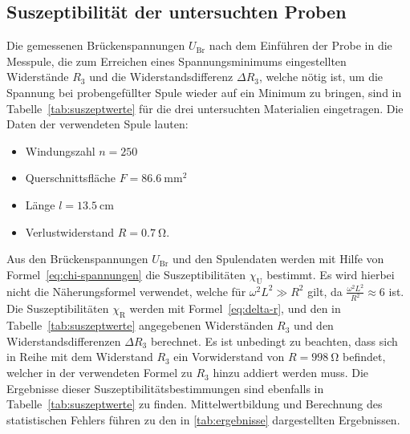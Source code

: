 \subsection{Suszeptibilität der untersuchten Proben}
%
Die gemessenen Brückenspannungen $U_\text{Br}$ nach dem Einführen der
Probe in die Messpule, die zum Erreichen eines Spannungsminimums
eingestellten Widerstände $R_3$ und die Widerstandsdifferenz $\Delta
R_3$, welche nötig ist, um die Spannung bei probengefüllter Spule wieder
auf ein Minimum zu bringen, sind in Tabelle~\ref{tab:suszeptwerte} für
die drei untersuchten Materialien eingetragen.  Die Daten der
verwendeten Spule lauten:
%
\begin{itemize}
\item Windungszahl $n = 250$
\item Querschnittsfläche $F = \SI{86.6}{\milli\metre^2}$
\item Länge $l = \SI{13.5}{\centi\metre}$
\item Verlustwiderstand $R = \SI{0.7}{\ohm}$.
\end{itemize}

Aus den Brückenspannungen $U_\text{Br}$ und den Spulendaten werden mit
Hilfe von Formel~\eqref{eq:chi-spannungen} die Suszeptibilitäten
$\chi_\text{U}$ bestimmt.  Es wird hierbei nicht die Näherungsformel
verwendet, welche für $\omega^2 L^2 \gg R^2$ gilt, da $\frac{\omega^2
  L^2}{R^2} \approx 6$ ist.  Die Suszeptibilitäten $\chi_\text{R}$
werden mit Formel~\eqref{eq:delta-r}, und den in
Tabelle~\ref{tab:suszeptwerte} angegebenen Widerständen $R_3$ und den
Widerstandsdifferenzen $\Delta R_3$ berechnet.  Es ist unbedingt zu
beachten, dass sich in Reihe mit dem Widerstand $R_3$ ein Vorwiderstand
von $R = \SI{998}{\ohm}$ befindet, welcher in der verwendeten Formel zu
$R_3$ hinzu addiert werden muss.  Die Ergebnisse dieser
Suszeptibilitätsbestimmungen sind ebenfalls in
Tabelle~\ref{tab:suszeptwerte} zu finden.  Mittelwertbildung und
Berechnung des statistischen Fehlers führen zu den in
\cref{tab:ergebnisse} dargestellten Ergebnissen.
%

